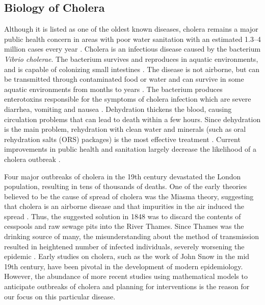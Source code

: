 \documentclass[12pt]{article}\usepackage[]{graphicx}\usepackage[]{color}
\begin{document}
\subsection{Biology of Cholera}
Although it is listed as one of the oldest known diseases, cholera remains a major public health concern in areas with poor water sanitation with an estimated 1.3--4 million cases every year \citep{link18}.
Cholera is an infectious disease caused by the bacterium \textit{Vibrio cholerae}.
The bacterium survives and reproduces in aquatic environments, and is capable of colonizing small intestines \citep{link8}.
The disease is not airborne, but can be transmitted through contaminated food or water and can survive in some aquatic environments from months to years \citep{link9}.
The bacterium produces enterotoxins responsible for the symptoms of cholera infection which are severe diarrhea, vomiting and nausea \citep{link11}.
Dehydration thickens the blood, causing circulation problems that can lead to death within a few hours.
Since dehydration is the main problem, rehydration with clean water and minerals (such as oral rehydration salts (ORS) packages) is the most effective treatment \citep{link18}.
Current improvements in public health and sanitation largely decrease the likelihood of a cholera outbreak \citep{link18}.\par
Four major outbreaks of cholera in the 19th century devastated the London population, resulting in tens of thousands of deaths.
One of the early theories believed to be the cause of spread of cholera was the Miasma theory, suggesting that cholera is an airborne disease and that impurities in the air induced the spread \citep{link1}.
Thus, the suggested solution in 1848 was to discard the contents of cesspools and raw sewage pits into the River Thames.
Since Thames was the drinking source of many, the misunderstanding about the method of transmission resulted in heightened number of infected individuals, severely worsening the epidemic \citep{link1}.
Early studies on cholera, such as the work of John Snow in the mid 19th century, have been pivotal in the development of modern epidemiology.
However, the abundance of more recent studies using mathematical models to anticipate outbreaks of cholera and planning for interventions is the reason for our focus on this particular disease.
\end{document}

